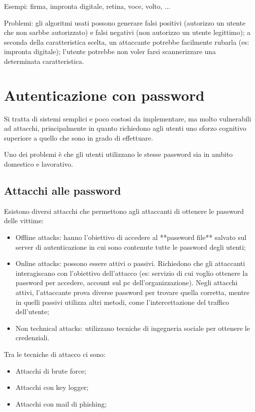 \noindent Esempi: firma, impronta digitale, retina, voce, volto, ...

\noindent Problemi: gli algoritmi usati possono generare falsi positivi (autorizzo un utente che non sarbbe autorizzato) e falsi negativi (non autorizzo un utente legittimo); a seconda della caratteristica scelta, un attaccante potrebbe facilmente rubarla (es: impronta digitale); l'utente potrebbe non voler farsi scannerizzare una determinata caratteristica. 

\section{Autenticazione con password}
Si tratta di sistemi semplici e poco costosi da implementare, ma molto vulnerabili ad attacchi, principalmente in quanto richiedono agli utenti uno sforzo cognitivo superiore a quello che sono in grado di effettuare. 

Uno dei problemi è che gli utenti utilizzano le stesse password sia in ambito domestico e lavorativo.

\subsection{Attacchi alle password}
Esistono diversi attacchi che permettono agli attaccanti di ottenere le password delle vittime:
\begin{itemize}
    \item Offline attacks: hanno l'obiettivo di accedere al **password file** salvato sul server di autenticazione in cui sono contenute tutte le password degli utenti;
    \item Online attacks: possono essere attivi o passivi. Richiedono che gli attaccanti interagiscano con l'obiettivo dell'attacco (es: servizio di cui voglio ottenere la password per accedere, account sul pc dell'organizzazione). Negli attacchi attivi, l'attaccante prova diverse password per trovare quella corretta, mentre in quelli passivi utilizza altri metodi, come l'intercettazione del traffico dell'utente;
    \item Non technical attacks: utilizzano tecniche di ingegneria sociale per ottenere le credenziali.
\end{itemize}

\noindent Tra le tecniche di attacco ci sono:
\begin{itemize}
    \item Attacchi di brute force;
    \item Attacchi con key logger;
    \item Attacchi con mail di phishing;
\end{itemize}

